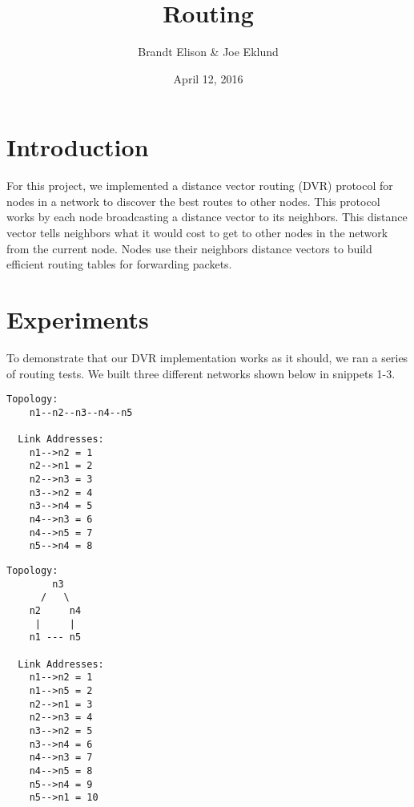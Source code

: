 \documentclass[11pt]{article}
\begin{document}
\lstset{
  language=Python,
  basicstyle=\small,          %
  keywordstyle=\bfseries,
  identifierstyle=,           %
  commentstyle=,              %
  stringstyle=\ttfamily,      %
  showstringspaces=false,     %
  numbers=left,
  numberstyle=\tiny,
  numbersep=5pt,
  frame=tb
}

\title{Routing}

\author{Brandt Elison & Joe Eklund}

\date{April 12, 2016}

\maketitle

\section{Introduction}

For this project, we implemented a distance vector routing (DVR) protocol for nodes in a network to discover the best routes to other nodes. This protocol works by each node broadcasting a distance vector to its neighbors. This distance vector tells neighbors what it would cost to get to other nodes in the network from the current node. Nodes use their neighbors distance vectors to build efficient routing tables for forwarding packets.

\section{Experiments}

To demonstrate that our DVR implementation works as it should, we ran a series of routing tests. We built three different networks shown below in snippets 1-3.

\begin{lstlisting}[caption={5 nodes in a line}]
  Topology:
    n1--n2--n3--n4--n5

  Link Addresses:
    n1-->n2 = 1
    n2-->n1 = 2
    n2-->n3 = 3
    n3-->n2 = 4
    n3-->n4 = 5
    n4-->n3 = 6
    n4-->n5 = 7
    n5-->n4 = 8
\end{lstlisting}

\begin{lstlisting}[caption={5 nodes in a ring}]
  Topology:
        n3 
      /   \
    n2     n4
     |     |
    n1 --- n5

  Link Addresses:
    n1-->n2 = 1
    n1-->n5 = 2
    n2-->n1 = 3
    n2-->n3 = 4
    n3-->n2 = 5
    n3-->n4 = 6
    n4-->n3 = 7
    n4-->n5 = 8
    n5-->n4 = 9
    n5-->n1 = 10
\end{lstlisting}
\end{document}
